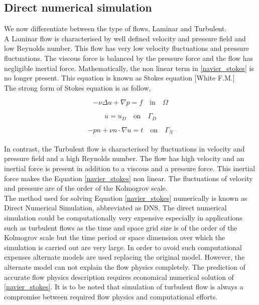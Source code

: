 \documentclass[a4paper,12pt]{book}
\begin{document}
\subsection[DNS]{Direct numerical simulation} 

We now differentiate between the type of flows, Laminar and Turbulent.\\
A Laminar flow is characterised by well defined velocity and pressure field and low Reynolds number. This flow has very low velocity fluctuations and pressure fluctuations. The viscous force is balanced by the pressure force and the flow has negligible inertial force. Mathematically, the non linear term in \eqref{navier_stokes} is no longer present. This equation is known as Stokes equation [White F.M.\cite{white}]\\

The strong form of Stokes equation is as follow,

\begin{equation} \label{stokes_strong_form}
-\nu \Delta u + \nabla p = f \quad \textrm{in} \quad \Omega
\end{equation}

\begin{equation} \label{dirichlet condition stokes}
u = u_D \quad \textrm{on} \quad \Gamma_D
\end{equation}

\begin{equation} \label{neumann condition stokes}
-pn + \nu n \cdot \nabla u = t \quad \textrm{on} \quad \Gamma_N
\end{equation}
\\
In contrast, the Turbulent flow is characterised by fluctuations in velocity and pressure field and a high Reynolds number. The flow has high velocity and an inertial force is present in addition to a viscous and a pressure force. This inertial force makes the Equation \eqref{navier_stokes} non linear. The fluctuations of velocity and pressure are of the order of the Kolmogrov scale.\\

The method used for solving Equation \eqref{navier_stokes} numerically is known as Direct Numerical Simulation, abbreviated as DNS. The direct numerical simulation could be computationally very expensive especially in applications such as turbulent flows as the time and space grid size is of the order of the Kolmogrov scale but the time period or space dimension over which the simulation is carried out are very large. In order to avoid such computational expenses alternate models are used replacing the original model. However, the alternate model can not explain the flow physics completely. The prediction of accurate flow physics description requires economical numerical solution of \eqref{navier_stokes}. It is to be noted that simulation of turbulent flow is always a compromise between required flow physics and computational efforts.
\end{document}
